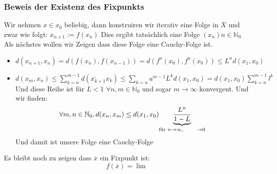 \documentclass{article}
\newcommand{\mspc}{\hspace{0.7cm}}
\begin{document}
\subsubsection*{Beweis der Existenz des Fixpunkts} Wir nehmen $x\in x_0$ beliebig, dann konstruiren wir iterativ eine Folge in $X$ und zwar wie folgt: $x_{n+1}:=f(x_n)$ Dies ergibt tatsächlich eine Folge $(x_n)n\in\mathbb{N}_0$ Als nächstes wollen wir Zeigen dass diese Folge eine Cauchy-Folge ist.
\begin{itemize}
  \item{$d(x_{n+1},x_n)=d(f(x_n),f(x_{n-1}))=d(f^n(x_0),f^n(x_0))\le L^nd(x_1,x_0)$}
  \item{$d(x_m,x_n)\le \sum_{k=n}^{m-1}d(x_{k+1}^,x_k)\le\sum_{k=n}a^{m-1}L^kd(x_1,x_0)=d(x_1,x_0)\sum_{k=n}^{m-1}l^k$ Und diese Reihe ist für $L<1$ $\forall n,m\in \mathbb{N}_0$ und sogar $m\rightarrow\infty$ konvergent.
  Und wir finden:\[\forall m,n\in\mathbb{N}_0, d(x_n,x_m)\le d(x_1,x_0)\underset{\text{für }n\rightarrow\infty,\mspc \rightarrow0}{\underbrace{\frac{L^n}{1-L}}} \]Und damit ist unsere Folge eine Cauchy-Folge }
\end{itemize}
Es bleibt noch zu zeigen dass $\overline{x}$ ein Fixpunkt ist:
\[f(\overline{x})=\lim_{}\]
\end{document}
